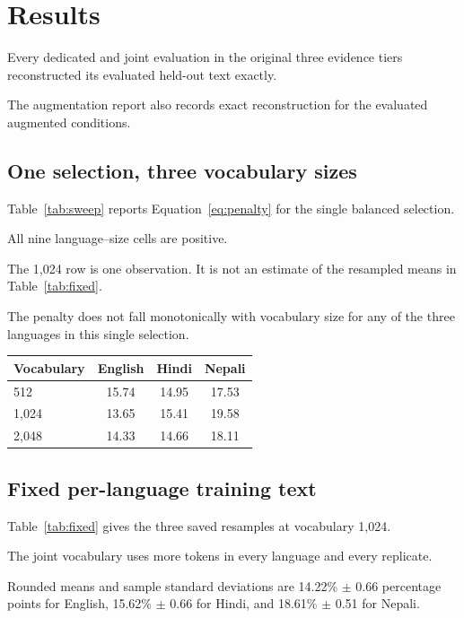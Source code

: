 \documentclass[10pt,twocolumn]{article}
\begin{document}
\section{Results}

Every dedicated and joint evaluation in the original
three evidence tiers reconstructed its evaluated
held-out text exactly.

The augmentation report also records exact
reconstruction for the evaluated augmented conditions.

\subsection{One selection, three vocabulary sizes}

Table~\ref{tab:sweep} reports Equation~\ref{eq:penalty}
for the single balanced selection.

All nine language--size cells are positive.

The 1,024 row is one observation. It is not an estimate
of the resampled means in Table~\ref{tab:fixed}.

The penalty does not fall monotonically with vocabulary
size for any of the three languages in this single
selection.

\begin{center}
\small
\begin{tabular}{@{}lccc@{}}
\toprule
Vocabulary & English & Hindi & Nepali \\
\midrule
512 & 15.74 & 14.95 & 17.53 \\
1,024 & 13.65 & 15.41 & 19.58 \\
2,048 & 14.33 & 14.66 & 18.11 \\
\bottomrule
\end{tabular}

\label{tab:sweep}
\end{center}

\subsection{Fixed per-language training text}

Table~\ref{tab:fixed} gives the three saved resamples
at vocabulary 1,024.

The joint vocabulary uses more tokens in every language
and every replicate.

Rounded means and sample standard deviations are
14.22\% $\pm$ 0.66 percentage points for English,
15.62\% $\pm$ 0.66 for Hindi, and
18.61\% $\pm$ 0.51 for Nepali.
\end{document}
